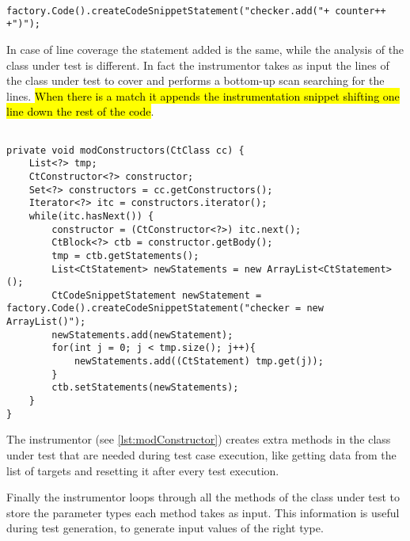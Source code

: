 \begin{minipage}{\linewidth}
\begin{lstlisting}[caption={Snippet creation},label={lst:addSnippet}]% Start your code-block
	
factory.Code().createCodeSnippetStatement("checker.add("+ counter++ +")");
\end{lstlisting}
\end{minipage}

In case of line coverage the statement added is the same, while the analysis of the class under test is different. In fact the instrumentor takes as input the lines of the class under test to cover and performs a bottom-up scan searching for the lines. \hl{When there is a match it appends the instrumentation snippet shifting one line down the rest of the code}.

\begin{minipage}{\linewidth}
\begin{lstlisting}[caption={The function to add the ArrayList instantiation snippet},label={lst:modConstructor}]% Start your code-block

private void modConstructors(CtClass cc) {
	List<?> tmp;
	CtConstructor<?> constructor;
	Set<?> constructors = cc.getConstructors();
	Iterator<?> itc = constructors.iterator();
	while(itc.hasNext()) {
		constructor = (CtConstructor<?>) itc.next();
		CtBlock<?> ctb = constructor.getBody();
		tmp = ctb.getStatements();
		List<CtStatement> newStatements = new ArrayList<CtStatement>();
		CtCodeSnippetStatement newStatement = factory.Code().createCodeSnippetStatement("checker = new ArrayList()");
		newStatements.add(newStatement);
		for(int j = 0; j < tmp.size(); j++){
			newStatements.add((CtStatement) tmp.get(j));
		}
		ctb.setStatements(newStatements);
	}
}
\end{lstlisting}
\end{minipage}

The instrumentor (see \autoref{lst:modConstructor})
creates extra methods in the class under test that are needed during test case execution, like getting data from the list of targets and resetting it after  every test execution.

Finally the instrumentor loops through all the methods of the class under test to store the parameter types each method takes as input. This information is useful during test generation, to generate input values of the right type.